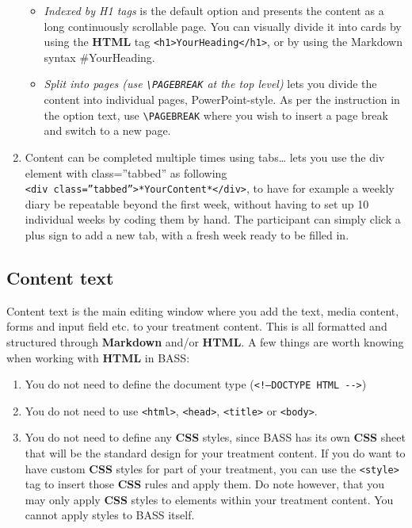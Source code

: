 \documentclass[
]{book}
\providecommand{\tightlist}{%
  \setlength{\itemsep}{0pt}\setlength{\parskip}{0pt}}
\begin{document}
\begin{enumerate}
  \begin{itemize}
  \tightlist
  \item
    \emph{Indexed by H1 tags} is the default option and presents the content as a long continuously scrollable page. You can visually divide it into cards by using the \textbf{HTML} tag \texttt{\textless{}h1\textgreater{}YourHeading\textless{}/h1\textgreater{}}, or by using the Markdown syntax \#YourHeading.
  \item
    \emph{Split into pages (use \texttt{\textbackslash{}PAGEBREAK} at the top level)} lets you divide the content into individual pages, PowerPoint-style. As per the instruction in the option text, use \texttt{\textbackslash{}PAGEBREAK} where you wish to insert a page break and switch to a new page.
  \end{itemize}
\item
  Content can be completed multiple times using tabs\ldots{} lets you use the div element with class=''tabbed'' as following \texttt{\textless{}div\ class=”tabbed”\textgreater{}*YourContent*\textless{}/div\textgreater{}}, to have for example a weekly diary be repeatable beyond the first week, without having to set up 10 individual weeks by coding them by hand. The participant can simply click a plus sign to add a new tab, with a fresh week ready to be filled in.
\end{enumerate}

\subsection{Content text}\label{content-text}

Content text is the main editing window where you add the text, media content, forms and input field etc. to your treatment content. This is all formatted and structured through \textbf{Markdown} and/or \textbf{HTML}.
A few things are worth knowing when working with \textbf{HTML} in BASS:

\begin{enumerate}
\def\labelenumi{\arabic{enumi}.}
\tightlist
\item
  You do not need to define the document type (\texttt{\textless{}!—DOCTYPE\ HTML\ -\/-\textgreater{}})
\item
  You do not need to use \texttt{\textless{}html\textgreater{}}, \texttt{\textless{}head\textgreater{}}, \texttt{\textless{}title\textgreater{}} or \texttt{\textless{}body\textgreater{}}.
\item
  You do not need to define any \textbf{CSS} styles, since BASS has its own \textbf{CSS} sheet that will be the standard design for your treatment content. If you do want to have custom \textbf{CSS} styles for part of your treatment, you can use the \texttt{\textless{}style\textgreater{}} tag to insert those \textbf{CSS} rules and apply them. Do note however, that you may only apply \textbf{CSS} styles to elements within your treatment content. You cannot apply styles to BASS itself.
\end{enumerate}
\end{document}

